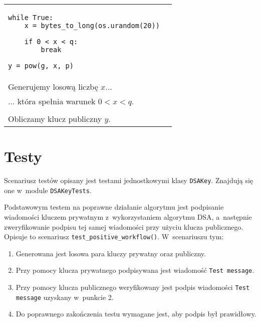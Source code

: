 \documentclass{article}
\begin{document}
        \noindent\begin{table}[ht!]
            \begin{tabular}{lr}
                \begin{minipage}[t]{0.45\textwidth}
                    \begin{verbatim}
while True:
    x = bytes_to_long(os.urandom(20))

    if 0 < x < q:
        break

y = pow(g, x, p)
                    \end{verbatim}
                \end{minipage}
                
                &
        
                \begin{minipage}[t]{0.45\textwidth}                    
                    \noindent \\ Generujemy losową liczbę $x$... \\
                    
                    \noindent ... która spełnia warunek $0 < x < q$. \\ \\
                    
                    \noindent Obliczamy klucz publiczny $y$.
                \end{minipage}
            
                \\
            
            \end{tabular}
        \end{table}
            
    \section*{Testy}
    
        Scenariusz testów opisany jest testami jednostkowymi klasy \verb+DSAKey+. Znajdują się one w~module \verb+DSAKeyTests+.
        
        Podstawowym testem na poprawne działanie algorytmu jest podpisanie wiadomości kluczem prywatnym z~wykorzystaniem algorytmu DSA, a~następnie zweryfikowanie podpisu tej samej wiadomości przy użyciu klucza publicznego. Opisuje to scenariusz \verb+test_positive_workflow()+. W~scenariuszu tym:
        
        \begin{enumerate}
            \item Generowana jest losowa para kluczy prywatny oraz publiczny.
            \item Przy pomocy klucza prywatnego podpisywana jest wiadomość \verb+Test message+.
            \item Przy pomocy klucza publicznego weryfikowany jest podpis wiadomości \verb+Test message+ uzyskany w~punkcie 2.
            \item Do poprawnego zakończenia testu wymagane jest, aby podpis był prawidłowy.
        \end{enumerate}
\end{document}
